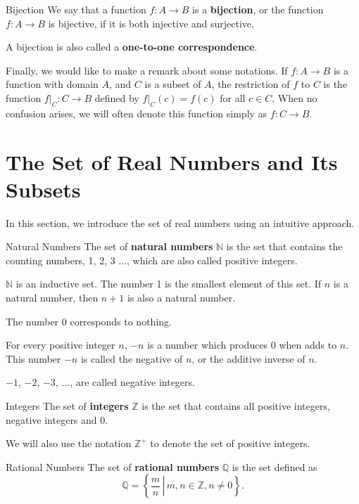 \begin{definition}{Bijection}
We say that a function $f:A\to B$ is a {\bf bijection}, or the function $f:A\rightarrow B$ is bijective, if it is both injective and surjective.

A bijection is also called a  {\bf one-to-one correspondence}.

\end{definition}

Finally, we would like to make a remark about some notations. If $f:A\rightarrow B$ is a function with domain $A$, and $C$ is a subset of $A$, the restriction of $f$ to $C$ is the function $f|_C:C\rightarrow B$ defined by $f|_C(c)=f(c)$ for all $c\in C$. When no confusion arises, we will often denote this function simply as $f:C\rightarrow B$.
\vp
\section{The Set of Real Numbers and Its Subsets}\label{sec1.2}
In this section, we introduce the set of real numbers using an intuitive approach. 

\begin{definition}{Natural Numbers}
The set of {\bf natural numbers} $\mathbb{N}$ is the set that contains the counting numbers,    1, 2, 3 $\ldots$, which are also called positive integers. 
\end{definition}

$\mathbb{N}$ is an inductive set. The number 1 is the smallest element of this set. If $n$ is a natural number, then $n+1$ is also a natural number.  

The number 0 corresponds to nothing. 

For every positive integer $n$, $-n$ is a number which   produces 0 when adds to $n$. This number $-n$ is called the negative of $n$, or the additive inverse of $n$.

$-1$, $-2$, $-3$, $\ldots$, are called negative integers.

\begin{definition}{Integers}
The set of {\bf integers} $\mathbb{Z}$ is the set that contains all positive integers, negative integers and 0.
\end{definition}

We will also use the notation $\mathbb{Z}^+$ to denote the set of positive integers. 

\begin{definition}{Rational Numbers}
 The set of {\bf rational numbers} $\mathbb{Q}$ is the set defined as
\[\mathbb{Q}=\left\{\left.\frac{m}{n}\,\right|\,m,n\in\mathbb{Z}, n\neq 0\right\}.\]
\end{definition}


